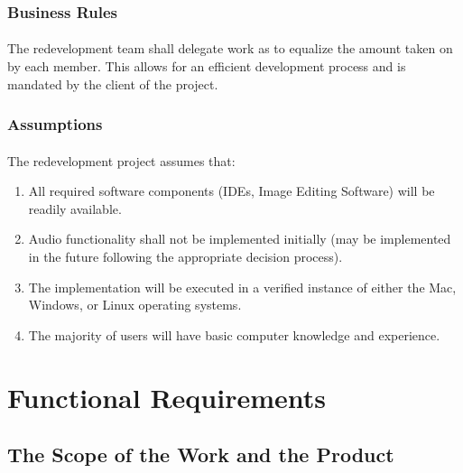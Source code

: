 \documentclass[12pt, titlepage]{article}
\begin{document}
\subsubsection{Business Rules}
\paragraph{}
The redevelopment team shall delegate work as to equalize the amount taken on by each member. This allows for an efficient development process and is mandated by the client of the project.

\subsubsection{Assumptions}
\paragraph{}
The redevelopment project assumes that:
\begin{enumerate}[i]
\item All required software components (IDEs, Image Editing Software) will be readily available.
\item Audio functionality shall not be implemented initially (may be implemented in the future following the appropriate decision process).
\item The implementation will be executed in a verified instance of either the Mac, Windows, or Linux operating systems.
\item The majority of users will have basic computer knowledge and experience.
\end{enumerate}

\section{Functional Requirements}

\subsection{The Scope of the Work and the Product}
\end{document}
